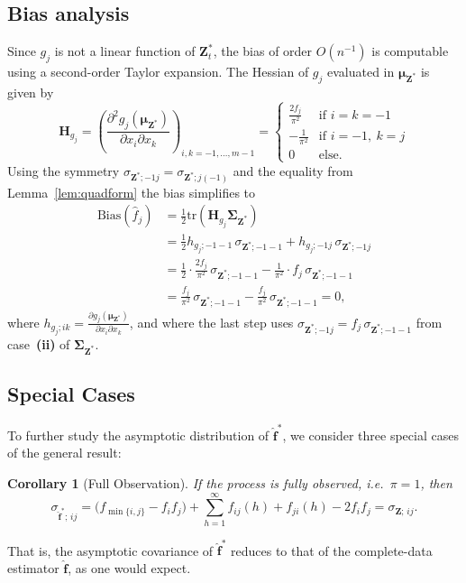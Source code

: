﻿\documentclass[12pt,a4paper]{scrreprt}
\newtheorem{corollary}[theorem]{Corollary}
\theoremstyle{definition}
\begin{document}
\subsection*{Bias analysis}
Since $g_j$ is not a linear function of $\boldsymbol{Z}_t^*$, the bias of order
$O(n^{-1})$ is computable using a second-order Taylor expansion. The Hessian of $g_j$ evaluated in $\boldsymbol{\mu}_{\boldsymbol{Z}^*}$ is given by
\[
\boldsymbol{H}_{g_j} = \left(\frac{\partial^2 g_j(\boldsymbol{\mu_{Z^*}})}{\partial x_i \partial x_k}\right)_{i,k=-1,\ldots,m-1} =
\begin{cases}
    \frac{2f_j}{\pi^2}  & \text{if } i = k = -1 \\
    -\frac{1}{\pi^2}    & \text{if } i = -1,\ k = j \\
    0                   & \text{else.}
\end{cases}
\]
Using the symmetry $\sigma_{\boldsymbol{Z}^*;-1j} = \sigma_{\boldsymbol{Z}^*;j(-1)}$ and the equality from Lemma~\ref{lem:quadform} the bias simplifies to
\begin{align*}
    \mathrm{Bias}(\hat{f}_j)
    &= \frac{1}{2}\mathrm{tr}(\boldsymbol{H}_{g_j}\boldsymbol{\Sigma}_{\boldsymbol{Z}^*}) \\
    &= \frac{1}{2}h_{g_j;-1-1}\,\sigma_{\boldsymbol{Z}^*;-1-1}
        + h_{g_j;-1j}\,\sigma_{\boldsymbol{Z}^*;-1 j} \\
    &= \frac{1}{2}\cdot\frac{2f_j}{\pi^2}\,\sigma_{\boldsymbol{Z}^*;-1-1}
        - \frac{1}{\pi^2}\cdot f_j\,\sigma_{\boldsymbol{Z}^*;-1-1} \\
    &= \frac{f_j}{\pi^2}\,\sigma_{\boldsymbol{Z}^*;-1-1}
        - \frac{f_j}{\pi^2}\,\sigma_{\boldsymbol{Z}^*;-1-1} = 0,
\end{align*}
where $h_{g_j;ik} = \frac{\partial g_j(\boldsymbol{\mu_{Z^*}})}{\partial x_i \partial x_k}$, and where the last step uses $\sigma_{\boldsymbol{Z}^*;-1j} = f_j\,\sigma_{\boldsymbol{Z}^*;-1-1}$ 
from case~\textbf{(ii)} of \hyperref[rem:sigma_zstar]{$\boldsymbol{\Sigma}_{\boldsymbol{Z}^*}$}.\\
\subsection*{Special Cases}
To further study the asymptotic distribution of $\hat{\boldsymbol{f}}^*$,
we consider three special cases of the general result:

\begin{corollary}[Full Observation] \label{cor:Full Obs}
If the process is fully observed, i.e.\ $\pi = 1$, then
\[
    \sigma_{\hat{\boldsymbol{f}}^*;\, ij}
    = \bigl(f_{\min\{i,j\}} - f_if_j\bigr)
    + \sum_{h=1}^{\infty} f_{ij}(h) + f_{ji}(h) - 2f_if_j
    = \sigma_{\boldsymbol{Z};\, ij}.
\]
\end{corollary}
\noindent That is, the asymptotic covariance of $\hat{\boldsymbol{f}}^*$ reduces to that of
the complete-data estimator \hyperref[thm:clt_fhat]{$\hat{\boldsymbol{f}}$}, as one would expect.
\end{document}
